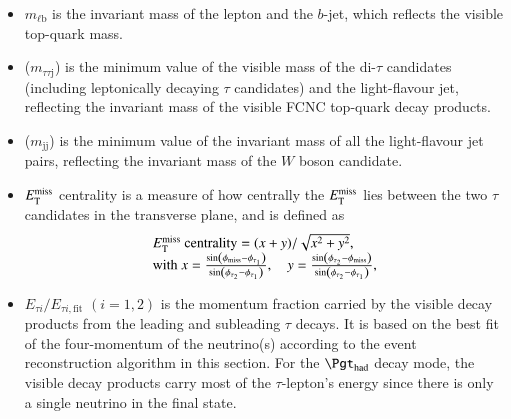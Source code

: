 \begin{itemize}
\item $m_{\ell \text{b}}$ is the invariant mass of the lepton and the $b$-jet, which reflects the visible top-quark mass.
\item {}($m_{\tau\tau \text{j}}$) is the minimum value of the visible mass of the di-$\tau$ candidates (including leptonically decaying $\tau$ candidates) and the light-flavour jet,
  reflecting the invariant mass of the visible FCNC top-quark decay products.
\item {}($m_{\text{jj}}$) is the minimum value of the invariant mass of all the light-flavour jet pairs, reflecting the invariant mass of the $W$ boson candidate.
\item $E_{\text{T}}^{\text{miss}}$ centrality is a measure of how centrally the $E_{\text{T}}^{\text{miss}}$ lies between the two $\tau$ candidates in the transverse plane, and is defined as
\begin{eqnarray*}
\begin{array}{l}
E_{\text{T}}^{\text{miss}}~\text{centrality} = {(x+y)}/{\sqrt{x^2+y^2}}, \\
\text{with}~x=\frac{\sin(\phi_{\text{miss}}-\phi_{\tau_1})}{\sin(\phi_{\tau_2}-\phi_{\tau_1})}, \quad  y=\frac{\sin(\phi_{\tau_2}-\phi_{\text{miss}})}{\sin(\phi_{\tau_2}-\phi_{\tau_1})} ,
\end{array}
\label{eq:eq3}
\end{eqnarray*}
\item $E_{\tau {i}}/E_{\tau {i},\text{fit}}$ $({i}=1,2)$ is the momentum fraction carried by the visible decay products from the leading and subleading $\tau$ decays. It is based on the best fit of the four-momentum of the neutrino(s) according to the event reconstruction algorithm in this section. For the $\tauhad$ decay mode, the visible decay products carry most of the $\tau$-lepton's energy since there is only a single neutrino in the final state.%

\end{itemize}
